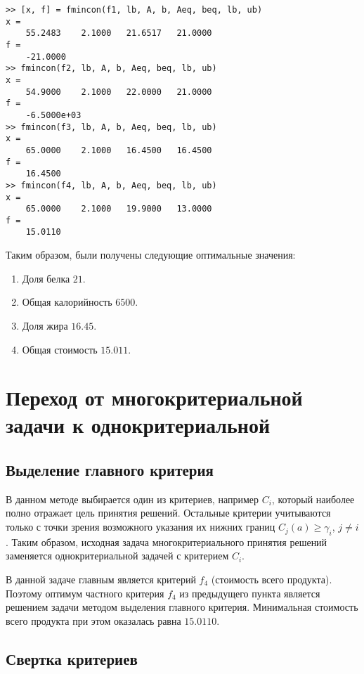 

\begin{lstlisting}[caption=\code{console.m}]
>> [x, f] = fmincon(f1, lb, A, b, Aeq, beq, lb, ub)
x =
	55.2483    2.1000   21.6517   21.0000
f =
	-21.0000
>> fmincon(f2, lb, A, b, Aeq, beq, lb, ub)
x =
	54.9000    2.1000   22.0000   21.0000
f =
	-6.5000e+03
>> fmincon(f3, lb, A, b, Aeq, beq, lb, ub)
x =
	65.0000    2.1000   16.4500   16.4500
f =
	16.4500
>> fmincon(f4, lb, A, b, Aeq, beq, lb, ub)
x =
	65.0000    2.1000   19.9000   13.0000
f =
	15.0110
\end{lstlisting}

Таким образом, были получены следующие оптимальные значения:

\begin{enumerate}
	\item Доля белка $21$.
	\item Общая калорийность $6500$.
	\item Доля жира $16.45$.
	\item Общая стоимость $15.011$.
\end{enumerate}

\section{Переход от многокритериальной задачи к однокритериальной}

\subsection{Выделение главного критерия}

В данном методе выбирается один из критериев, например $C_i$, который наиболее полно отражает цель принятия решений. Остальные критерии учитываются только с точки зрения возможного указания их нижних границ $C_j(a) \geq \gamma_i$, $j \neq i$. Таким образом, исходная задача многокритериального принятия решений заменяется однокритериальной задачей с критерием $C_i$.

В данной задаче главным является критерий $f_4$ (стоимость всего продукта). Поэтому оптимум частного критерия $f_4$ из предыдущего пункта является решением задачи методом выделения главного критерия. Минимальная стоимость всего продукта при этом оказалась равна $15.0110$.

\subsection{Свертка критериев}

